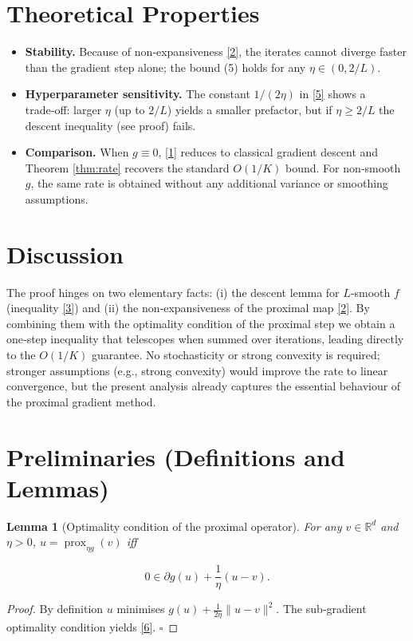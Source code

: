 \documentclass{article}
\newtheorem{lemma}{Lemma}
\newcommand{\prox}{\operatorname{prox}}
\newcommand{\R}{\mathbb{R}}
\begin{document}
\section*{Theoretical Properties}
\begin{itemize}
  \item \textbf{Stability.} Because of non‑expansiveness \eqref{2}, the iterates cannot diverge faster than the gradient step alone; the bound (5) holds for any $\eta\in(0,2/L)$.
  \item \textbf{Hyperparameter sensitivity.} The constant $1/(2\eta)$ in \eqref{5} shows a trade‑off: larger $\eta$ (up to $2/L$) yields a smaller prefactor, but if $\eta\ge 2/L$ the descent inequality (see proof) fails.
  \item \textbf{Comparison.} When $g\equiv0$, \eqref{1} reduces to classical gradient descent and Theorem \ref{thm:rate} recovers the standard $O(1/K)$ bound. For non‑smooth $g$, the same rate is obtained without any additional variance or smoothing assumptions.
\end{itemize}

\section*{Discussion}
The proof hinges on two elementary facts: (i) the descent lemma for $L$‑smooth $f$ (inequality \eqref{3}) and (ii) the non‑expansiveness of the proximal map \eqref{2}. By combining them with the optimality condition of the proximal step we obtain a one‑step inequality that telescopes when summed over iterations, leading directly to the $O(1/K)$ guarantee. No stochasticity or strong convexity is required; stronger assumptions (e.g., strong convexity) would improve the rate to linear convergence, but the present analysis already captures the essential behaviour of the proximal gradient method.

\section*{Preliminaries (Definitions and Lemmas)}
\begin{lemma}[Optimality condition of the proximal operator]\label{lem:prox-opt}
For any $v\in\R^{d}$ and $\eta>0$, $u=\prox_{\eta g}(v)$ iff  

\[
0\in \partial g(u)+\frac1\eta (u-v). \tag{6}
\]
\end{lemma}
\begin{proof}
By definition $u$ minimises $g(u)+\frac1{2\eta}\|u-v\|^{2}$. The sub‑gradient optimality condition yields \eqref{6}. \hfill $\square$
\end{proof}
\end{document}
